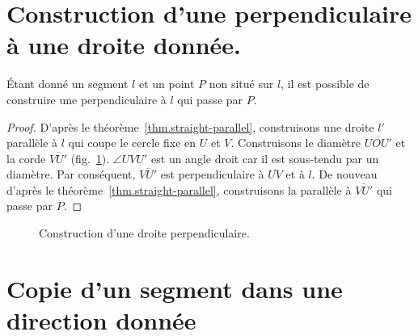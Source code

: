 \section{Construction d'une perpendiculaire à une droite donnée.}\label{s.perp}

\begin{theorem}\label{thm.straight-perp}
Étant donné un segment  $l$ et un point $P$ non situé sur $l$, il est possible de construire une perpendiculaire à $l$ qui passe par $P$.
\end{theorem}

\begin{proof}
D'après le théorème~\ref{thm.straight-parallel}, construisons une droite $l'$ parallèle à $l$ qui coupe le cercle fixe en $U$ et $V$. Construisons le diamètre $\overline{UOU'}$ et la corde $\overline{VU'}$ (fig.~\ref{f.se-perp}). $\angle UVU'$ est un angle droit car il est sous-tendu par un diamètre. Par conséquent, $\overline{VU'}$ est perpendiculaire à $\overline{UV}$ et à $l$. De nouveau d'après le théorème~\ref{thm.straight-parallel}, construisons la parallèle à $\overline{VU'}$ qui passe par $P$.
\end{proof}

\begin{figure}[htbp]
\centering
{}
\caption{Construction d'une droite perpendiculaire.}\label{f.se-perp}
\end{figure}



\section{Copie d'un segment dans une direction donnée}\label{s.copy}

